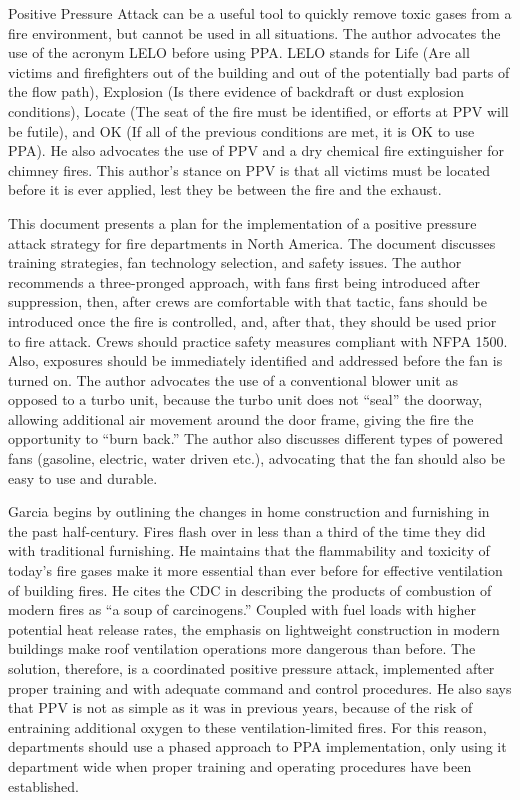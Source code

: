 \documentclass{article}
\begin{document}
\begin{appendices}
Positive Pressure Attack can be a useful tool to quickly remove toxic gases from a fire environment, but cannot be used in all situations. The author advocates the use of the acronym LELO before using PPA. LELO stands for Life (Are all victims and firefighters out of the building and out of the potentially bad parts of the flow path), Explosion (Is there evidence of backdraft or dust explosion conditions), Locate (The seat of the fire must be identified, or efforts at PPV will be futile), and OK (If all of the previous conditions are met, it is OK to use PPA). He also advocates the use of PPV and a dry chemical fire extinguisher for chimney fires. This author’s stance on PPV is that all victims must be located before it is ever applied, lest they be between the fire and the exhaust.\cite{TurgeonPPV}

This document presents a plan for the implementation of a positive pressure attack strategy for fire departments in North America. The document discusses training strategies, fan technology selection, and safety issues. The author recommends a three-pronged approach, with fans first being introduced after suppression, then, after crews are comfortable with that tactic, fans should be introduced once the fire is controlled, and, after that, they should be used prior to fire attack. Crews should practice safety measures compliant with NFPA 1500. Also, exposures should be immediately identified and addressed before the fan is turned on. The author advocates the use of a conventional blower unit as opposed to a turbo unit, because the turbo unit does not “seal” the doorway, allowing additional air movement around the door frame, giving the fire the opportunity to “burn back.”  The author also discusses different types of powered fans (gasoline, electric, water driven etc.), advocating that the fan should also be easy to use and durable.\cite{ImplementStrat}

Garcia begins by outlining the changes in home construction and furnishing in the past half-century. Fires flash over in less than a third of the time they did with traditional furnishing. He maintains that the flammability and toxicity of today’s fire gases make it more essential than ever before for effective ventilation of building fires. He cites the CDC in describing the products of combustion of modern fires as “a soup of carcinogens.” Coupled with fuel loads with higher potential heat release rates, the emphasis on lightweight construction in modern buildings make roof ventilation operations more dangerous than before. The solution, therefore, is a coordinated positive pressure attack, implemented after proper training and with adequate command and control procedures. He also says that PPV is not as simple as it was in previous years, because of the risk of entraining additional oxygen to these ventilation-limited fires. For this reason, departments should use a phased approach to PPA implementation, only using it department wide when proper training and operating procedures have been established.\cite{GarciaPPVatStructures}
	

\end{appendices}
\end{document}
